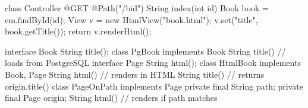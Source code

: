 \documentclass{article}
\begin{document}
\begin{lnSnippet}
class Controller {
  @GET
  @Path("/b{id}")
  String index(int id) {
    Book book = em.findById(id);
    View v = new HtmlView("book.html");
    v.set("title", book.getTitle());
    return v.renderHtml();
  }
}
\end{lnSnippet}
\begin{lnSnippet}
interface Book
  String title();
class PgBook implements Book
  String title() // loads from PostgreSQL
interface Page
  String html();
class HtmlBook implements Book, Page
  String html() // renders in HTML
  String title() // returns origin.title()
class PageOnPath implements Page
  private final String path;
  private final Page origin;
  String html() // renders if path matches
\end{lnSnippet}

\end{document}
